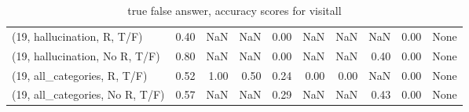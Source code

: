 \begin{table*}[h!]
\begin{adjustbox}{width=2\columnwidth,center}
\begin{tabular}{lrrr|rrr|rrr}
(19, hallucination, R, T/F)           &                      0.40 &                   NaN &                       NaN &                          0.00 &                       NaN &                           NaN &                                    NaN &                               0.00 &                                  None \\
(19, hallucination, No R, T/F)        &                      0.80 &                   NaN &                       NaN &                          0.00 &                       NaN &                           NaN &                                   0.40 &                               0.00 &                                  None \\
(19, all\_categories, R, T/F)          &                      0.52 &                  1.00 &                      0.50 &                          0.24 &                      0.00 &                          0.00 &                                    NaN &                               0.00 &                                  None \\
(19, all\_categories, No R, T/F)       &                      0.57 &                   NaN &                       NaN &                          0.29 &                       NaN &                           NaN &                                   0.43 &                               0.00 &                                  None \\


\bottomrule
\end{tabular}
\end{adjustbox}
\caption{true false answer, accuracy scores for visitall}
\end{table*}